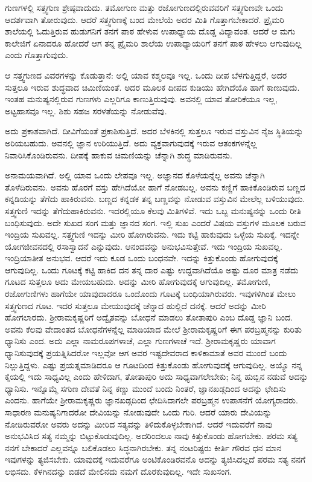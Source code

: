 ಗುಣಗಳಲ್ಲಿ ಸತ್ತ್ವಗುಣ ಶ್ರೇಷ್ಠವಾದುದು. ತಮೋಗುಣ ಮತ್ತು ರಜೋಗುಣದಲ್ಲಿರುವವರಿಗೆ ಸತ್ತ್ವಗುಣವೇ ಒಂದು ಆದರ್ಶವಾಗಿ ತೋರುವುದು. ಆದರೆ ಸತ್ತ್ವಗುಣಕ್ಕೆ ಬಂದ ಮೇಲೆಯೆ ಅದರ ಮಿತಿ ಗೊತ್ತಾಗಬೇಕಾದರೆ. ಪ್ರೈಮರಿ ಶಾಲೆಯಲ್ಲಿ ಓದುತ್ತಿರುವ ಹುಡುಗನಿಗೆ ತನಗೆ ಪಾಠ ಹೇಳುವ ಉಪಾಧ್ಯಾಯ ದೊಡ್ಡ ವಿದ್ಯಾವಂತ. ಆದರೆ ಆ ಮಗು ಕಾಲೇಜಿಗೆ ಏನಾದರೂ ಹೋದರೆ ಆಗ ತನ್ನ ಪ್ರೈಮರಿ ಶಾಲೆಯ ಉಪಾಧ್ಯಾಯರಿಗೆ ತನಗೆ ಪಾಠ ಹೇಳಲು ಆಗುವುದಿಲ್ಲ ಎಂದು ಗೊತ್ತಾಗುವುದು.

ಆ ಸತ್ತ್ವಗುಣದ ವಿವರಗಳನ್ನು ಕೊಡುತ್ತಾನೆ: ಅಲ್ಲಿ ಯಾವ ಕಶ್ಮಲವೂ ಇಲ್ಲ. ಒಂದು ದೀಪ ಬೆಳಗುತ್ತಿದ್ದರೆ, ಅದರ ಸುತ್ತಲೂ ಇರುವ ಶುದ್ಧವಾದ ಚಿಮಿಣಿಯಂತೆ. ಅದರ ಮೂಲಕ ದೀಪದ ಕುಡಿಯು ಹೇಗಿದೆಯೊ ಹಾಗೆ ಕಾಣುವುದು. ಇಂತಹ ಮನುಷ್ಯನಲ್ಲಿರುವ ಗುಣಗಳು ಎಲ್ಲರಿಗೂ ಕಾಣುತ್ತಿರುವುವು. ಅವನಲ್ಲಿ ಯಾವ ತೋರಿಕೆಯೂ ಇಲ್ಲ, ಅಟ್ಟಹಾಸವೂ ಇಲ್ಲ. ಶಿಶು ಸಹಜ ಸರಳತೆಯನ್ನು ನೋಡುವೆವು.

ಅದು ಪ್ರಕಾಶವಾಗಿದೆ. ದೀವಿಗೆಯಂತೆ ಪ್ರಕಾಶಿಸುತ್ತಿದೆ. ಅದರ ಬೆಳಕಿನಲ್ಲಿ ಸುತ್ತಲೂ ಇರುವ ವಸ್ತುವಿನ ನೈಜ ಸ್ಥಿತಿಯನ್ನು ಅರಿಯಬಹುದು. ಅವನಲ್ಲಿ ಜ್ಞಾನ ಉರಿಯುತ್ತಿದೆ. ಅದು ವ್ಯಕ್ತವಾಗುವುದಕ್ಕೆ ಇರುವ ಆತಂಕಗಳನ್ನೆಲ್ಲ ನಿವಾರಿಸಿಕೊಂಡಿರುವನು. ದೀಪಕ್ಕೆ ಹಾಕುವ ಚಿಮಣಿಯನ್ನು ಚೆನ್ನಾಗಿ ಶುದ್ಧ ಮಾಡಿರುವನು.

ಅನಾಮಯವಾಗಿದೆ. ಅಲ್ಲಿ ಯಾವ ಒಂದು ಲೇಪವೂ ಇಲ್ಲ. ಅಜ್ಞಾನದ ಕೊಳೆಯನ್ನೆಲ್ಲ ಅವನು ಚೆನ್ನಾಗಿ ತೊಳೆದಿರುವನು. ಅವನು ಹೊರಗೆ ವಸ್ತು ಹೇಗಿದೆಯೋ ಹಾಗೆ ನೋಡಬಲ್ಲ. ಅವನು ಕಣ್ಣಿಗೆ ಹಾಕಿಕೊಂಡಿರುವ ಬಣ್ಣದ ಕನ್ನಡಿಯನ್ನು ತೆಗೆದು ಹಾಕಿರುವನು. ಬಣ್ಣದ ಕನ್ನಡಕ ತನ್ನ ಬಣ್ಣವನ್ನು ನೋಡುವ ವಸ್ತುವಿನ ಮೇಲೆಲ್ಲ ಬಳಿಯುವುದು. ಸತ್ತ್ವಗುಣಿ ಇದನ್ನು ತೆಗೆದುಹಾಕಿರುವನು. ಇದರಲ್ಲಿಯೂ ಕೆಲವು ಮಿತಿಗಳಿವೆ. ಇದು ಒಬ್ಬ ಮನುಷ್ಯನನ್ನು ಒಂದು ರೀತಿ ಬಂಧಿಸುವುದು. ಅದೇ ಸುಖದ ಸಂಗ ಮತ್ತು ಜ್ಞಾನದ ಸಂಗ. ಇಲ್ಲಿ ಸುಖ ಎಂದರೆ ವಿಷಯ ವಸ್ತುಗಳ ಮೂಲಕ ಬರುವ ಇಂದ್ರಿಯ ಸುಖವಲ್ಲ. ಸತ್ತ್ವಗುಣಿ ಇದನ್ನು ಮೀರಿ ಹೋಗಿರುವನು. ಇದು ಕಟ್ಟಿ ಹಾಕುವುದು ಒಳ್ಳೆಯ ಸುಖಕ್ಕೆ. ಇದನ್ನೇ ಯೋಗಜೀವನದಲ್ಲಿ ರಸಾಸ್ವಾದನೆ ಎನ್ನುವುದು. ಆನಂದವನ್ನು ಅನುಭವಿಸುತ್ತೇವೆ. ಇದು ಇಂದ್ರಿಯ ಸುಖವಲ್ಲ. ಇಂದ್ರಿಯಾತೀತ ಅನುಭವ. ಆದರೆ ಇದು ಕೂಡ ಒಂದು ಬಂಧನವೇ. ಇದನ್ನು ಕಿತ್ತುಕೊಂಡು ಹೋಗುವುದಕ್ಕೆ ಆಗುವುದಿಲ್ಲ. ಒಂದು ಗೂಟಕ್ಕೆ ಕಟ್ಟಿ ಹಾಕಿದ ದನ ತನ್ನ ದಾರ ಎಷ್ಟು ಉದ್ದವಾಗಿದೆಯೊ ಅಷ್ಟು ದೂರ ಮಾತ್ರ ನಡೆದು ಗೂಟದ ಸುತ್ತಲೂ ಅದು ಮೇಯಬಹುದು. ಅದನ್ನು ಮೀರಿ ಹೋಗುವುದಕ್ಕೆ ಆಗುವುದಿಲ್ಲ. ತಮೋಗುಣಿ, ರಜೋಗುಣಿಗಳು ಹಾಗೆಯೇ ಯಾವುದಾದರೂ ಒಂದೊಂದು ಗೂಟಕ್ಕೆ ಬಂಧಿಯಾಗಿರುವರು. ಇವುಗಳಿಗಿಂತ ಮೇಲು ಸತ್ತ್ವಗುಣದ ಗೂಟ. ಇದರ ಸುತ್ತಲೂ ಮೇಯುವುದಕ್ಕೆ ಚೆನ್ನಾದ ಹುಲ್ಲಿದೆ ದನಕ್ಕೆ. ಆದರೆ ಅದನ್ನು ಮೀರಿ ಹೋಗಲಾರದು. ಶ‍್ರೀರಾಮಕೃಷ್ಣರಿಗೆ ಅದ್ವೈತವನ್ನು ಬೋಧನೆ ಮಾಡಲು ತೋತಾಪುರಿ ಎಂಬ ದೊಡ್ಡ ಜ್ಞಾನಿ ಬಂದ. ಅವನು ಕೆಲವು ವೇದಾಂತದ ಬೋಧನೆಗಳನ್ನೆಲ್ಲ ಮಾಡಿಯಾದ ಮೇಲೆ ಶ‍್ರೀರಾಮಕೃಷ್ಣರಿಗೆ ಈಗ ಪರಬ್ರಹ್ಮನನ್ನು ಕುರಿತು ಧ್ಯಾನಿಸು ಎಂದ. ಅದು ಎಲ್ಲಾ ನಾಮರೂಪಗಳಾಚೆ, ಎಲ್ಲಾ ಗುಣಗಳಾಚೆ ಇದೆ. ಶ‍್ರೀರಾಮಕೃಷ್ಣರು ಯಾವಾಗ ಧ್ಯಾನಿಸುವುದಕ್ಕೆ ಪ್ರಯತ್ನಿಸಿದರೋ ಇಲ್ಲವೋ ಆಗ ಅವರ ಇಷ್ಟದೇವರಾದ ಕಾಳಿಕಾಮಾತೆ ಅವರ ಮುಂದೆ ಬಂದು ನಿಲ್ಲುತ್ತಿದ್ದಳು. ಎಷ್ಟು ಪ್ರಯತ್ನಮಾಡಿದರೂ ಆ ಗೂಟದಿಂದ ಕಿತ್ತುಕೊಂಡು ಹೋಗುವುದಕ್ಕೆ ಆಗುವುದಿಲ್ಲ. ಅಯ್ಯೊ ನನ್ನ ಕೈಯಲ್ಲಿ ಇದು ಸಾಧ್ಯವಿಲ್ಲ ಎಂದು ಹೇಳಿದಾಗ, ತೋತಾಪುರಿ ಅದು ಸಾಧ್ಯವಾಗಲೇಬೇಕು; ನಿನ್ನ ಹುಬ್ಬಿನ ನಡುವೆ ಅದನ್ನು ಧ್ಯಾನಿಸು. ಇನ್ನೊಮ್ಮೆ ಸಗುಣ ದೇವತೆ ನಿನ್ನ ಕಣ್ಣು ಮುಂದೆ ಬಂದು ನಿಂತರೆ, ಜ್ಞಾನಖಡ್ಗದಿಂದ ಅದನ್ನು ಛೇದಿಸು ಎಂದನು. ಹಾಗೆಯೇ ಶ‍್ರೀರಾಮಕೃಷ್ಣರು ಜ್ಞಾನಖಡ್ಗದಿಂದ ಛೇದಿಸಿದಾಗಲೇ ಪರಬ್ರಹ್ಮನ ಉಪಾಸನೆಗೆ ಯೋಗ್ಯರಾದರು. ಸಾಧಾರಣ ಮನುಷ್ಯನಿಗಾದರೋ ದೇವಿಯನ್ನು ನೋಡುವುದೇ ಒಂದು ಗುರಿ. ಆದರೆ ಯಾರು ದೇವಿಯನ್ನು ನೋಡಿರುವರೋ ಅವರು ಅದನ್ನು ಮೀರಿದ ಸತ್ಯವನ್ನು ತಿಳಿದುಕೊಳ್ಳಬೇಕಾಗಿದೆ. ಆದರೆ ಇದುವರೆಗೆ ನಾವು ಅನುಭವಿಸಿದ ಸತ್ಯ ನಮ್ಮನ್ನು ಬಿಟ್ಟುಕೊಡುವುದಿಲ್ಲ. ಅದರಿಂದಲೂ ನಾವು ಕಿತ್ತುಕೊಂಡು ಹೋಗಬೇಕು. ಪರಮ ಸತ್ಯ ನನಗೆ ಬೇಕಾದರೆ ಎಲ್ಲವನ್ನೂ ಬಲಿಕೊಡಲು ಸಿದ್ಧನಾಗಿರಬೇಕು. ತನ್ನ ನಂಟರಿಷ್ಟರು ಕೀರ್ತಿ ಗೌರವ ಧನ ಮಾನ ಇವುಗಳನ್ನು ತ್ಯಜಿಸಬೇಕು. ಯಾವುದಕ್ಕೆ ಇದುವರೆಗೂ ಅಂಟಿಕೊಂಡಿರವನೊ ಅದನ್ನು ತ್ಯಜಿಸಿದಲ್ಲದೆ ಪರಮ ಸತ್ಯ ನನಗೆ ಲಭಿಸದು. ಕೆಳಗಿನದನ್ನು ಬಿಡದೆ ಮೇಲಿನದು ನಮಗೆ ದೊರಕುವುದಿಲ್ಲ. ಇದೇ ಸುಖಸಂಗ.


